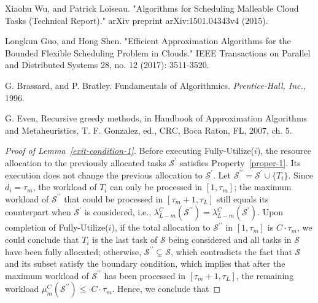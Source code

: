 \documentclass[10pt,journal,compsoc]{IEEEtran}
\begin{document}
\begin{thebibliography}{1}
Xiaohu Wu, and Patrick Loiseau. "Algorithms for Scheduling Malleable Cloud Tasks (Technical Report)." arXiv preprint arXiv:1501.04343v4 (2015).






Longkun Guo, and Hong Shen. "Efficient Approximation Algorithms for the Bounded Flexible Scheduling Problem in Clouds." IEEE Transactions on Parallel and Distributed Systems 28, no. 12 (2017): 3511-3520.










G. Brassard, and P. Bratley. Fundamentals of Algorithmics. {\em Prentice-Hall, Inc.}, 1996.

G. Even, Recursive greedy methods, in Handbook of Approximation Algorithms and Metaheuristics, T. F. Gonzalez, ed., CRC, Boca Raton, FL, 2007, ch. 5.


\end{thebibliography}

\appendix



\begin{proof}[Proof of Lemma~\ref{exit-condition-1}]
Before executing Fully-Utilize($i$), the resource allocation to the previously allocated tasks $\mathcal{S}^{\prime}$ satisfies Property~\ref{proper-1}. Its execution does not change the previous allocation to $\mathcal{S}^{\prime}$. Let $\mathcal{S}^{\prime\prime}=\mathcal{S}^{\prime}\cup\{T_{i}\}$. Since $d_{i}=\tau_{m}$, the workload of $T_{i}$ can only be processed in $[1, \tau_{m}]$; the maximum workload of $\mathcal{S}^{\prime\prime}$ that could be processed in $[\tau_{m}+1, \tau_{L}]$ still equals its counterpart when $\mathcal{S}^{\prime}$ is considered, i.e., $\lambda_{L-m}^{C}(\mathcal{S}^{\prime\prime})=\lambda_{L-m}^{C}(\mathcal{S}^{\prime})$. Upon completion of Fully-Utilize($i$), if the total allocation to $\mathcal{S}^{\prime\prime}$ in $[1, \tau_{m}]$ is $C\cdot\tau_{m}$, we could conclude that $T_{i}$ is the last task of $\mathcal{S}$ being considered and all tasks in $\mathcal{S}$ have been fully allocated; otherwise, $\mathcal{S}^{\prime\prime}\subsetneq\mathcal{S}$, which contradicts the fact that $\mathcal{S}$ and its subset satisfy the boundary condition, which implies that after the maximum workload of $\mathcal{S}^{\prime\prime}$ has been processed in $[\tau_{m}+1, \tau_{L}]$, the remaining workload $\mu_{m}^{C}(\mathcal{S}^{\prime\prime})\leq \cdot C\cdot\tau_{m}$. Hence, we conclude that
\end{proof}
\end{document}
